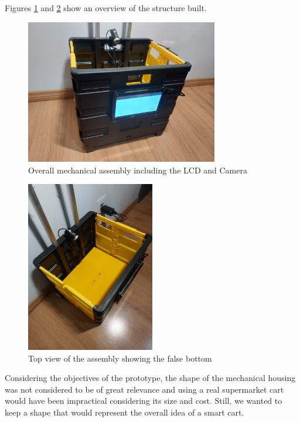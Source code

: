 \documentclass[openright]{normas-utf-tex} %
\begin{document}
Figures \ref{fig:prototype1} and \ref{fig:prototype2} show an overview of the structure built.

\begin{figure}[H]
	\centering
	\includegraphics[width=0.75\textwidth]{./images/cart.jpeg}
	\caption[Overall mechanical assembly including the LCD and Camera]{Overall mechanical assembly including the LCD and Camera}
    \label{fig:prototype1}
\end{figure}

\begin{figure}[H]
	\centering
	\includegraphics[width=0.5\textwidth]{./images/carttop.jpeg}
	\caption[Top view of the assembly showing the false bottom]{Top view of the assembly showing the false bottom}
    \label{fig:prototype2}
\end{figure}

Considering the objectives of the prototype, the shape of the mechanical
housing was not considered to be of great relevance and using a real
supermarket cart would have been impractical considering its size and cost. Still, we wanted
to keep a shape that would represent the overall idea of a smart cart.
\end{document}
